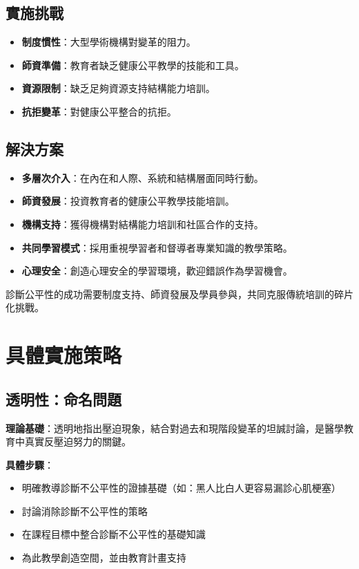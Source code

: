 \documentclass[12pt,a4paper]{article}
\newcommand{\note}[1]{
    \par
    \noindent
    \begin{tcolorbox}[
        colback=emergency_blue!5!white,
        colframe=emergency_blue,
        title=\textbf{重點提醒},
        fonttitle=\bfseries,
        boxrule=0.5pt,
        arc=3pt,
        left=6pt,
        right=6pt,
        top=6pt,
        bottom=6pt
    ]
    #1
    \end{tcolorbox}
}
\begin{document}
\subsection{實施挑戰}
\begin{itemize}[nosep]
    \item \textbf{制度慣性}：大型學術機構對變革的阻力。
    \item \textbf{師資準備}：教育者缺乏健康公平教學的技能和工具。
    \item \textbf{資源限制}：缺乏足夠資源支持結構能力培訓。
    \item \textbf{抗拒變革}：對健康公平整合的抗拒。
\end{itemize}

\subsection{解決方案}
\begin{itemize}[nosep]
    \item \textbf{多層次介入}：在內在和人際、系統和結構層面同時行動。
    \item \textbf{師資發展}：投資教育者的健康公平教學技能培訓。
    \item \textbf{機構支持}：獲得機構對結構能力培訓和社區合作的支持。
    \item \textbf{共同學習模式}：採用重視學習者和督導者專業知識的教學策略。
    \item \textbf{心理安全}：創造心理安全的學習環境，歡迎錯誤作為學習機會。
\end{itemize}

\vspace{0.5cm}
\note{
診斷公平性的成功需要制度支持、師資發展及學員參與，共同克服傳統培訓的碎片化挑戰。
}

\section{具體實施策略}

\subsection{透明性：命名問題}
\textbf{理論基礎}：透明地指出壓迫現象，結合對過去和現階段變革的坦誠討論，是醫學教育中真實反壓迫努力的關鍵。

\textbf{具體步驟}：
\begin{itemize}[nosep]
    \item 明確教導診斷不公平性的證據基礎（如：黑人比白人更容易漏診心肌梗塞）
    \item 討論消除診斷不公平性的策略
    \item 在課程目標中整合診斷不公平性的基礎知識
    \item 為此教學創造空間，並由教育計畫支持
\end{itemize}
\end{document}
